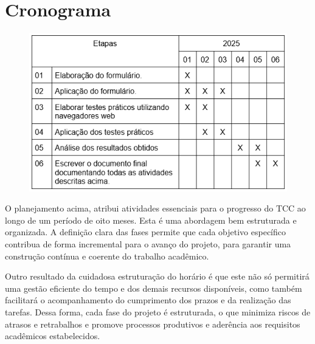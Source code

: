 \chapter{Cronograma}
\label{chap:cronograma}

\begin{figure}[!htb]
    \centering
    \includegraphics[width=0.85\linewidth]{assets/cronograma.png}
    \label{fig:cronograma}
\end{figure}

O planejamento acima, atribui atividades essenciais para o progresso do TCC ao longo de um período de oito meses. Esta é uma abordagem bem estruturada e organizada. A definição clara das fases permite que cada objetivo específico contribua de forma incremental para o avanço do projeto, para garantir uma construção contínua e coerente do trabalho acadêmico. 

Outro resultado da cuidadosa estruturação do horário é que este não só permitirá uma gestão eficiente do tempo e dos demais recursos disponíveis, como também facilitará o acompanhamento do cumprimento dos prazos e da realização das tarefas. Dessa forma, cada fase do projeto é estruturada, o que minimiza riscos de atrasos e retrabalhos e promove processos produtivos e aderência aos requisitos acadêmicos estabelecidos.